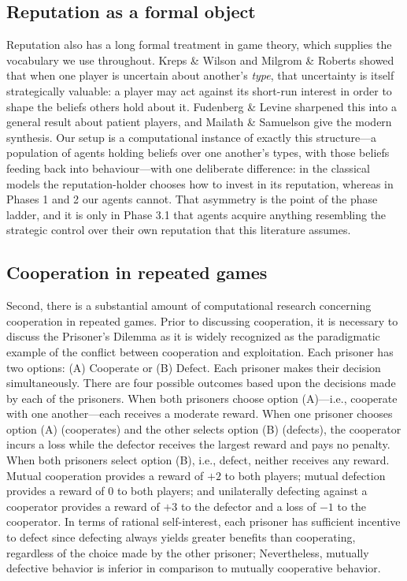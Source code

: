 \documentclass[journal]{IEEEtran}
\begin{document}
\subsection{Reputation as a formal object}
Reputation also has a long formal treatment in game theory, which
supplies the vocabulary we use throughout. Kreps \& Wilson
\citep{kreps1982reputation} and Milgrom \& Roberts
\citep{milgrom1982predation} showed that when one player is
uncertain about another's \emph{type}, that uncertainty is itself
strategically valuable: a player may act against its short-run
interest in order to shape the beliefs others hold about it.
Fudenberg \& Levine \citep{fudenberg1989reputation} sharpened this
into a general result about patient players, and Mailath \&
Samuelson \citep{mailath2006repeated} give the modern synthesis.
Our setup is a computational instance of exactly this structure---a
population of agents holding beliefs over one another's types, with
those beliefs feeding back into behaviour---with one deliberate
difference: in the classical models the reputation-holder chooses
how to invest in its reputation, whereas in Phases 1 and 2 our
agents cannot. That asymmetry is the point of the phase ladder, and
it is only in Phase 3.1 that agents acquire anything resembling the
strategic control over their own reputation that this literature
assumes.

\subsection{Cooperation in repeated games}
Second, there is a substantial amount of computational research
concerning cooperation in repeated games. Prior to discussing
cooperation, it is necessary to discuss the Prisoner's Dilemma as it
is widely recognized as the paradigmatic example of the conflict
between cooperation and exploitation. Each prisoner has two options:
(A) Cooperate or (B) Defect. Each prisoner makes their decision
simultaneously. There are four possible outcomes based upon the
decisions made by each of the prisoners. When both prisoners choose
option (A)---i.e., cooperate with one another---each receives a
moderate reward. When one prisoner chooses option (A) (cooperates)
and the other selects option (B) (defects), the cooperator incurs a
loss while the defector receives the largest reward and pays no
penalty. When both prisoners select option (B), i.e., defect,
neither receives any reward. Mutual cooperation provides
a reward of $+2$ to both players; mutual defection provides a reward
of $0$ to both players; and unilaterally defecting against a
cooperator provides a reward of $+3$ to the defector and a loss of
$-1$ to the cooperator. In terms of rational self-interest, each prisoner has
sufficient incentive to defect since defecting always yields greater
benefits than cooperating, regardless of the choice made by the
other prisoner; Nevertheless, mutually defective behavior is
inferior in comparison to mutually cooperative behavior.
\end{document}
